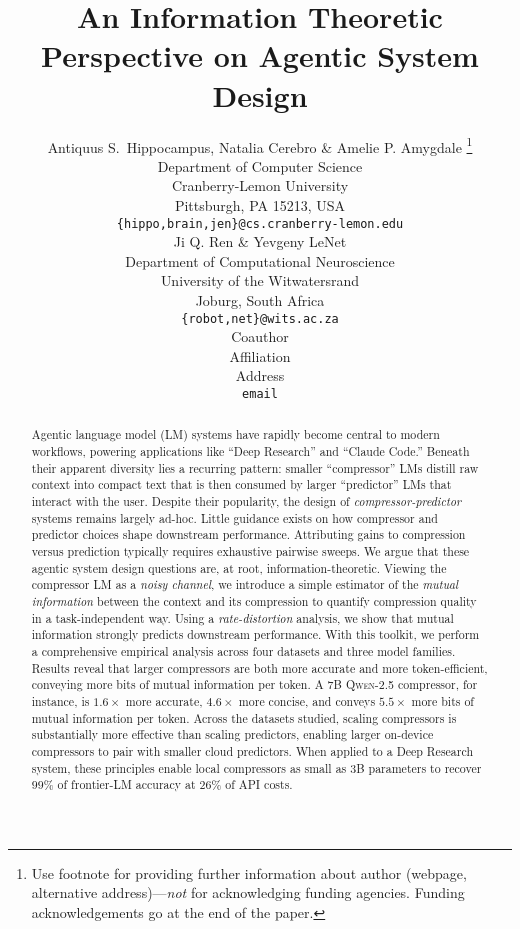 \documentclass{article} %
\title{An Information Theoretic Perspective on Agentic System Design}
\author{Antiquus S.~Hippocampus, Natalia Cerebro \& Amelie P. Amygdale \thanks{ Use footnote for providing further information
about author (webpage, alternative address)---\emph{not} for acknowledging
funding agencies.  Funding acknowledgements go at the end of the paper.} \\
Department of Computer Science\\
Cranberry-Lemon University\\
Pittsburgh, PA 15213, USA \\
\texttt{\{hippo,brain,jen\}@cs.cranberry-lemon.edu} \\
\And
Ji Q. Ren \& Yevgeny LeNet \\
Department of Computational Neuroscience \\
University of the Witwatersrand \\
Joburg, South Africa \\
\texttt{\{robot,net\}@wits.ac.za} \\
\AND
Coauthor \\
Affiliation \\
Address \\
\texttt{email}
}
\begin{document}
\maketitle

\begin{abstract}
Agentic language model (LM) systems have rapidly become central to modern workflows, powering applications like ``Deep Research'' and ``Claude Code.'' Beneath their apparent diversity lies a recurring pattern: smaller ``compressor'' LMs distill raw context into compact text that is then consumed by larger ``predictor'' LMs that interact with the user. Despite their popularity, the design of \emph{compressor-predictor} systems remains largely ad-hoc. Little guidance exists on how compressor and predictor choices shape downstream performance. Attributing gains to compression versus prediction typically requires exhaustive pairwise sweeps. We argue that these agentic system design questions are, at root, information-theoretic. Viewing the compressor LM as a \emph{noisy channel}, we introduce a simple estimator of the \emph{mutual information} between the context and its compression to quantify compression quality in a task-independent way. Using a \emph{rate-distortion} analysis, we show that mutual information strongly predicts downstream performance. With this toolkit, we perform a comprehensive empirical analysis across four datasets and three model families. Results reveal that larger compressors are both more accurate and more token-efficient, conveying more bits of mutual information per token. 
A 7B \textsc{Qwen-2.5} compressor, for instance, is $1.6\times$ more accurate, $4.6\times$ more concise, and conveys $5.5\times$ more bits of mutual information per token. Across the datasets studied, scaling compressors is substantially more effective than scaling predictors, enabling larger on-device compressors to pair with smaller cloud predictors.
When applied to a Deep Research system, these principles enable local compressors as small as 3B parameters to recover $99\%$ of frontier-LM accuracy at $26\%$ of API costs.






\end{abstract}
\end{document}
